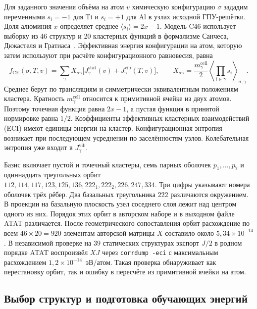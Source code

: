 \documentclass[11pt,a4paper]{article}
\begin{document}
Для заданного значения объёма на атом \(v\) химическую конфигурацию
\(\sigma\) зададим переменными \(s_i=-1\) для Ti и \(s_i=+1\) для Al
в узлах исходной ГПУ-решётки. Доля алюминия \(x\) определяет среднее
\(\langle s_i\rangle=2x-1\). Модель C46 использует выборку из 46
структур и 20 кластерных функций в формализме Санчеса, Дюкастеля и
Гратиаса~\cite{sanchez1984}. Эффективная энергия конфигурации на
атом, которую затем используют при расчёте конфигурационного равновесия, равна
\begin{equation}
 f_{\mathrm{CE}}(\sigma,T,v)
 =\sum_{\gamma}X_{\sigma\gamma}
 \bigl[J_\gamma^{\mathrm{stat}}(v)+
 J_\gamma^{\mathrm{vib}}(T,v)\bigr],
 \qquad
 X_{\sigma\gamma}=\frac{m_\gamma^{\mathrm{cell}}}{2}
 \left\langle\prod_{i\in\gamma}s_i\right\rangle_{\sigma,\gamma}.
 \label{eq:ce-model-normalization}
\end{equation}
Среднее берут по трансляциям и симметрически эквивалентным положениям
кластера. Кратность \(m_\gamma^{\mathrm{cell}}\) относится к примитивной
ячейке из двух атомов. Поэтому точечная функция равна \(2x-1\), а пустая
функция в принятой нормировке равна \(1/2\). Коэффициенты эффективных
кластерных взаимодействий (ECI) имеют единицы энергии на кластер.
Конфигурационная энтропия возникает при последующем усреднении по
заселённостям узлов. Колебательная энтропия уже входит в
\(J_\gamma^{\mathrm{vib}}\).

Базис включает пустой и точечный кластеры, семь парных оболочек
\(p_1,\ldots,p_7\) и одиннадцать треугольных орбит
\(112,114,117,123,125,136,222_1,222_2,226,247,334\).
Три цифры указывают номера оболочек трёх рёбер. Два базальных треугольника
\(222\) различаются окружением. В проекции на базальную плоскость
узел соседнего слоя лежит над центром одного из них. Порядок этих орбит в
авторском наборе и в выходном файле ATAT различается. После геометрического
сопоставления орбит расхождение по всем \(46\times20=920\) элементам
авторской матрицы \(X\) составило около \(5{,}34\times10^{-14}\). В
независимой проверке на 39 статических структурах экспорт \(J/2\) в
родном порядке ATAT воспроизвёл \(XJ\) через \texttt{corrdump -eci}
с максимальным расхождением \(1{,}2\times10^{-14}\)~эВ/атом. Такая
проверка обнаруживает как перестановку орбит, так и ошибку в пересчёте
из примитивной ячейки на атом.

\subsection{Выбор структур и подготовка обучающих энергий}
\end{document}
